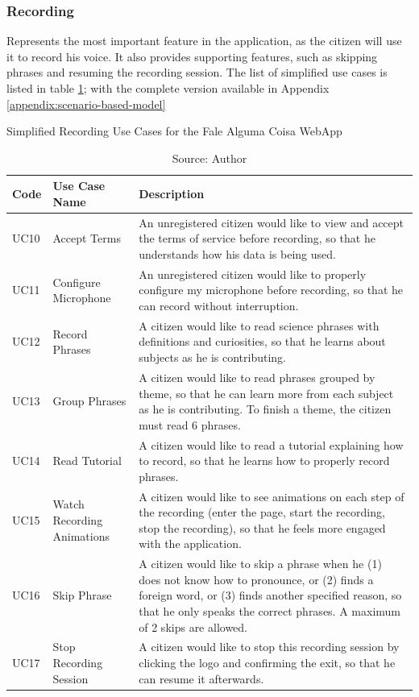 \clearpage
\subsubsection{Recording}

Represents the most important feature in the application, as the citizen will use it to record his voice. It also provides supporting features, such as skipping phrases and resuming the recording session. The list of simplified use cases is listed in table \ref{tab:falealgumacoisa-simplified-recording}; with the complete version available in Appendix \ref{appendix:scenario-based-model}

\begin{table}[h]
\caption{Simplified Recording Use Cases for the Fale Alguma Coisa WebApp}
\label{tab:falealgumacoisa-simplified-recording}
\centering
\begin{tabular}{|p{1cm}|p{3cm}|p{10cm}|}
\hline
    Code & Use Case Name & Description \\ \hline
    UC10 & Accept Terms & An unregistered citizen would like to view and accept the terms of service before recording, so that he understands how his data is being used. \\ \hline
    UC11 & Configure Microphone & An unregistered citizen would like to properly configure my microphone before recording, so that he can record without interruption. \\ \hline
    UC12 & Record Phrases & A citizen would like to read science phrases with definitions and curiosities, so that he learns about subjects as he is contributing. \\ \hline
    UC13 & Group Phrases & A citizen would like to read phrases grouped by theme, so that he can learn more from each subject as he is contributing. To finish a theme, the citizen must read 6 phrases. \\ \hline
    UC14 & Read Tutorial & A citizen would like to read a tutorial explaining how to record, so that he learns how to properly record phrases. \\ \hline
    UC15 & Watch Recording Animations & A citizen would like to see animations on each step of the recording (enter the page, start the recording, stop the recording), so that he feels more engaged with the application. \\ \hline
    UC16 & Skip Phrase & A citizen would like to skip a phrase when he (1) does not know how to pronounce, or (2) finds a foreign word, or (3) finds another specified reason, so that he only speaks the correct phrases. A maximum of 2 skips are allowed. \\ \hline
    UC17 & Stop Recording Session & A citizen would like to stop this recording session by clicking the logo and confirming the exit, so that he can resume it afterwards. \\ \hline
\end{tabular}
\caption*{Source: Author}
\end{table}

